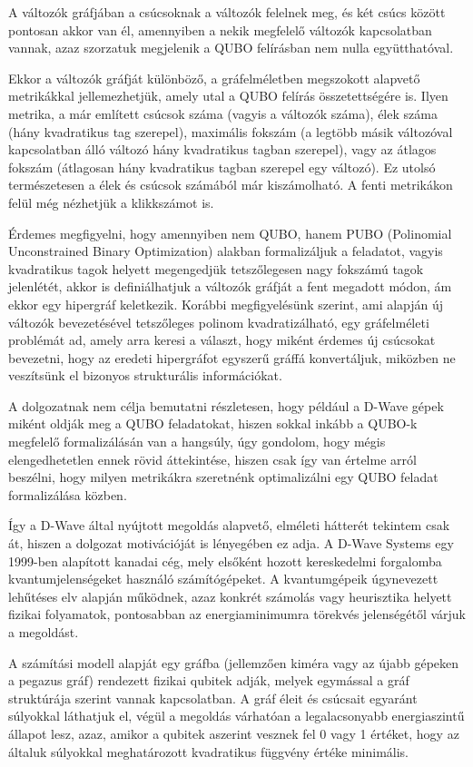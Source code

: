 A változók gráfjában a csúcsoknak a változók felelnek meg, és két csúcs között pontosan akkor van él, amennyiben a nekik megfelelő változók kapcsolatban vannak, azaz szorzatuk megjelenik a QUBO felírásban nem nulla együtthatóval.

Ekkor a változók gráfját különböző, a gráfelméletben megszokott alapvető metrikákkal jellemezhetjük, amely utal a QUBO felírás összetettségére is. Ilyen metrika, a már említett csúcsok száma (vagyis a változók száma), élek száma (hány kvadratikus tag szerepel), maximális fokszám (a legtöbb másik változóval kapcsolatban álló változó hány kvadratikus tagban szerepel), vagy az átlagos fokszám (átlagosan hány kvadratikus tagban szerepel egy változó). Ez utolsó természetesen a élek és csúcsok számából már kiszámolható. A fenti metrikákon felül még nézhetjük a klikkszámot is.

Érdemes megfigyelni, hogy amennyiben nem QUBO, hanem PUBO (Polinomial Unconstrained Binary Optimization) alakban formalizáljuk a feladatot, vagyis kvadratikus tagok helyett megengedjük tetszőlegesen nagy fokszámú tagok jelenlétét, akkor is definiálhatjuk a változók gráfját a fent megadott módon, ám ekkor egy hipergráf keletkezik. Korábbi megfigyelésünk szerint, ami alapján új változók bevezetésével tetszőleges polinom kvadratizálható, egy gráfelméleti problémát ad, amely arra keresi a választ, hogy miként érdemes új csúcsokat bevezetni, hogy az eredeti hipergráfot egyszerű gráffá konvertáljuk, miközben ne veszítsünk el bizonyos strukturális információkat.


A dolgozatnak nem célja bemutatni részletesen, hogy például a D-Wave gépek miként oldják meg a QUBO feladatokat, hiszen sokkal inkább a QUBO-k megfelelő formalizálásán van a hangsúly, úgy gondolom, hogy mégis elengedhetetlen ennek rövid áttekintése, hiszen csak így van értelme arról beszélni, hogy milyen metrikákra szeretnénk optimalizálni egy QUBO feladat formalizálása közben.

Így a D-Wave által nyújtott megoldás alapvető, elméleti hátterét tekintem csak át, hiszen a dolgozat motivációját is lényegében ez adja. A D-Wave Systems egy 1999-ben alapított kanadai cég, mely elsőként hozott kereskedelmi forgalomba kvantumjelenségeket használó számítógépeket. A kvantumgépeik úgynevezett lehűtéses elv alapján működnek, azaz konkrét számolás vagy heurisztika helyett fizikai folyamatok, pontosabban az energiaminimumra törekvés jelenségétől várjuk a megoldást. \cite{Szabo}

A számítási modell alapját egy gráfba (jellemzően kiméra vagy az újabb gépeken a pegazus gráf) rendezett fizikai qubitek adják, melyek egymással a gráf struktúrája szerint vannak kapcsolatban. A gráf éleit és csúcsait egyaránt súlyokkal láthatjuk el, végül a megoldás várhatóan a legalacsonyabb energiaszintű állapot lesz, azaz, amikor a qubitek aszerint vesznek fel 0 vagy 1 értéket, hogy az általuk súlyokkal meghatározott kvadratikus függvény értéke minimális.

